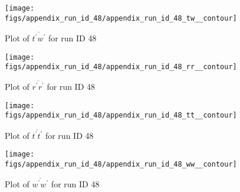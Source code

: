 \begin{figure}[H]
\centering
\texttt{[image: figs/appendix\_run\_id\_48/appendix\_run\_id\_48\_tw\_\_contour]}
\caption{Plot of $\overline{t^\prime w^\prime}$ for run ID 48}
\label{fig:appendix_run_id_48_tw__contour}
\end{figure}


\begin{figure}[H]
\centering
\texttt{[image: figs/appendix\_run\_id\_48/appendix\_run\_id\_48\_rr\_\_contour]}
\caption{Plot of $\overline{r^\prime r^\prime}$ for run ID 48}
\label{fig:appendix_run_id_48_rr__contour}
\end{figure}


\begin{figure}[H]
\centering
\texttt{[image: figs/appendix\_run\_id\_48/appendix\_run\_id\_48\_tt\_\_contour]}
\caption{Plot of $\overline{t^\prime t^\prime}$ for run ID 48}
\label{fig:appendix_run_id_48_tt__contour}
\end{figure}


\begin{figure}[H]
\centering
\texttt{[image: figs/appendix\_run\_id\_48/appendix\_run\_id\_48\_ww\_\_contour]}
\caption{Plot of $\overline{w^\prime w^\prime}$ for run ID 48}
\label{fig:appendix_run_id_48_ww__contour}
\end{figure}


